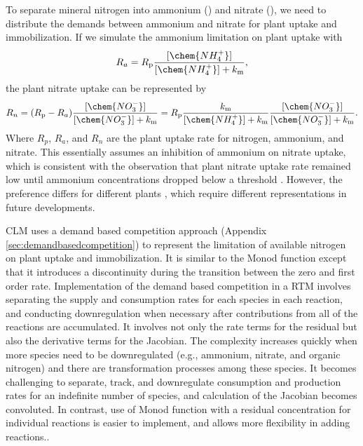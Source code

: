 \documentclass[gmd, manuscript]{copernicus}
\begin{document}
To separate mineral nitrogen into ammonium () and nitrate (), we need to distribute the demands between ammonium and nitrate for plant uptake and immobilization. If we simulate the ammonium limitation on plant uptake with 
\begin{equation}
R_a = R_\text{p} \frac{[\chem{NH_4^+}]}{[\chem{NH_4^+}]+k_\text{m}}, 
\label{eq:plantarate}
\end{equation}
the plant nitrate uptake can be represented by 
\begin{equation}
R_n = (R_\text{p} - R_a)\frac{[\chem{NO_3^-}]}{[\chem{NO_3^-}]+k_\text{m}} =
R_\text{p} \frac{k_\text{m}}{[\chem{NH_4^+}]+k_\text{m}}
\frac{[\chem{NO_3^-}]}{[\chem{NO_3^-}]+k_\text{m}}.  
\label{eq:plantnrate}
\end{equation}
Where $R_p$, $R_a$, and $R_n$ are the plant uptake rate for nitrogen, ammonium, and nitrate. This essentially assumes an inhibition of ammonium on nitrate uptake, which is consistent with
the observation that plant nitrate uptake rate remained low until ammonium concentrations dropped below a threshold \citep{eltrop1996}.  However, the preference differs for different plants \citep{Pfautsch2009,Warren2007,Nordin2001,Falkengren1995,Gherardi2013}, which require different representations in future developments.

CLM uses a demand based competition approach (Appendix \ref{sec:demandbasedcompetition}) to represent the limitation of available nitrogen on plant uptake and immobilization. It is similar to the Monod function except that it introduces a discontinuity during the transition between the zero and first order rate. Implementation of the demand based competition in a RTM involves separating the supply and consumption rates for each species in each reaction, and conducting downregulation when necessary after contributions from all of the reactions are accumulated. It involves not only the rate terms for the residual but also the derivative terms for the Jacobian. The complexity increases quickly when more species need to be downregulated (e.g., ammonium,
nitrate, and organic nitrogen) and there are transformation processes among these species. It becomes challenging to separate, track, and downregulate consumption and production rates for an indefinite number of species, and calculation of the Jacobian becomes convoluted. In contrast, use of Monod function with a residual concentration for individual reactions is easier to implement, and allows more flexibility in adding reactions..
\end{document}
